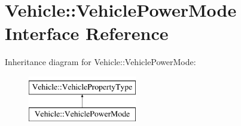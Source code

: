 \hypertarget{interfaceVehicle_1_1VehiclePowerMode}{\section{Vehicle\-:\-:Vehicle\-Power\-Mode Interface Reference}
\label{interfaceVehicle_1_1VehiclePowerMode}
}
Inheritance diagram for Vehicle\-:\-:Vehicle\-Power\-Mode\-:\begin{figure}[H]
\begin{center}
\leavevmode
\includegraphics[height=2.000000cm]{interfaceVehicle_1_1VehiclePowerMode}
\end{center}
\end{figure}
